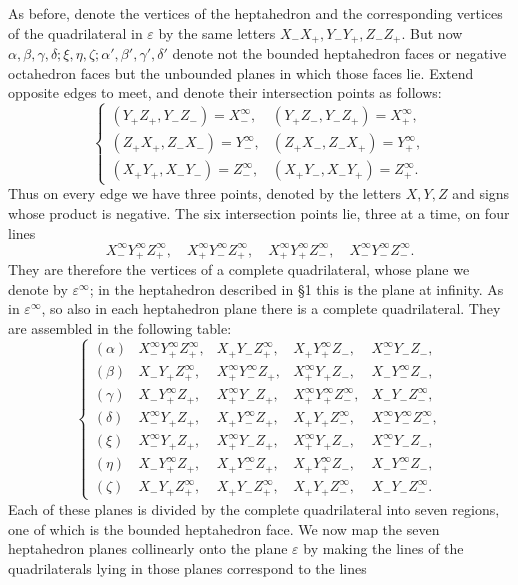 \documentclass[11pt,a4paper]{article}
\begin{document}
As before, denote the vertices of the heptahedron and the corresponding vertices of the quadrilateral in $\varepsilon$ by the same letters $X_-X_+,Y_-Y_+,Z_-Z_+$. But now $\alpha,\beta,\gamma,\delta;\xi,\eta,\zeta;\alpha',\beta',\gamma',\delta'$ denote not the bounded heptahedron faces or negative octahedron faces but the unbounded planes in which those faces lie. Extend opposite edges to meet, and denote their intersection points as follows:
\[
\left\{
\begin{array}{ll}
(Y_+Z_+,Y_-Z_-)=X_-^\infty,&(Y_+Z_-,Y_-Z_+)=X_+^\infty,\\
(Z_+X_+,Z_-X_-)=Y_-^\infty,&(Z_+X_-,Z_-X_+)=Y_+^\infty,\\
(X_+Y_+,X_-Y_-)=Z_-^\infty,&(X_+Y_-,X_-Y_+)=Z_+^\infty.
\end{array}\right.\tag{3}
\]
Thus on every edge we have three points, denoted by the letters $X,Y,Z$ and signs whose product is negative. The six intersection points lie, three at a time, on four lines
\[
 X_-^\infty Y_+^\infty Z_+^\infty,
 \quad X_+^\infty Y_-^\infty Z_+^\infty,
 \quad X_+^\infty Y_+^\infty Z_-^\infty,
 \quad X_-^\infty Y_-^\infty Z_-^\infty.
\]
They are therefore the vertices of a complete quadrilateral, whose plane we denote by $\varepsilon^\infty$; in the heptahedron described in \S 1 this is the plane at infinity. As in $\varepsilon^\infty$, so also in each heptahedron plane there is a complete quadrilateral. They are assembled in the following table:
\[
\renewcommand{\arraystretch}{1.15}
\left\{
\begin{array}{lllll}
(\alpha)&X_-^\infty Y_+^\infty Z_+^\infty,&X_+Y_-Z_+^\infty,&X_+Y_+^\infty Z_-,&X_-^\infty Y_-Z_-,\\
(\beta)&X_-Y_+Z_+^\infty,&X_+^\infty Y_-^\infty Z_+,&X_+^\infty Y_+Z_-,&X_-Y_-^\infty Z_-,\\
(\gamma)&X_-Y_+^\infty Z_+,&X_+^\infty Y_-Z_+,&X_+^\infty Y_+^\infty Z_-^\infty,&X_-Y_-Z_-^\infty,\\
(\delta)&X_-^\infty Y_+Z_+,&X_+Y_-^\infty Z_+,&X_+Y_+Z_-^\infty,&X_-^\infty Y_-^\infty Z_-^\infty,\\
(\xi)&X_-^\infty Y_+Z_+,&X_+^\infty Y_-Z_+,&X_+^\infty Y_+Z_-,&X_-^\infty Y_-Z_-,\\
(\eta)&X_-Y_+^\infty Z_+,&X_+Y_-^\infty Z_+,&X_+Y_+^\infty Z_-,&X_-Y_-^\infty Z_-,\\
(\zeta)&X_-Y_+Z_+^\infty,&X_+Y_-Z_+^\infty,&X_+Y_+Z_-^\infty,&X_-Y_-Z_-^\infty.
\end{array}\right.\tag{4}
\]
Each of these planes is divided by the complete quadrilateral into seven regions, one of which is the bounded heptahedron face. We now map the seven heptahedron planes collinearly onto the plane $\varepsilon$ by making the lines of the quadrilaterals lying in those planes correspond to the lines
\end{document}
